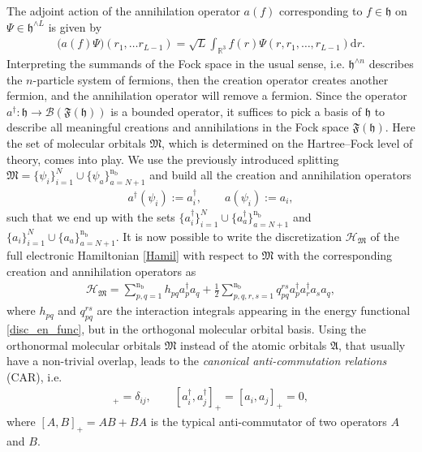 \documentclass[reqno]{amsart}
\begin{document}
 The adjoint action of the annihilation operator $a(f)$ corresponding to $f\in\mathfrak{h}$ on $\Psi\in\mathfrak{h}^{\wedge L}$ is given by \begin{align}
    \big(a(f)\Psi\big)(r_1,\ldots r_{L-1})=\sqrt{L}\int_{\mathbb{R}^3} f(r)\Psi(r,r_1,\ldots,r_{L-1})\mathrm{d}r.
\end{align} Interpreting the summands of the Fock space in the usual sense, i.e. $\mathfrak{h}^{\wedge n}$ describes the $n$-particle system of fermions, then the creation operator creates another fermion, and the annihilation operator will remove a fermion. Since the operator $a^{\dagger}:\mathfrak{h}\longrightarrow \mathcal{B}(\mathfrak{F}(\mathfrak{h}))$ is a bounded operator, it suffices to pick a basis of $\mathfrak{h}$ to describe all meaningful creations and annihilations in the Fock space $\mathfrak{F}(\mathfrak{h})$. Here the set of molecular orbitals $\mathfrak{M}$, which is determined on the Hartree–Fock level of theory, comes into play. We use the previously introduced splitting  $\mathfrak{M}=\lbrace{\psi}_i\rbrace_{i=1}^{N}\cup \lbrace \psi_a\rbrace_{a=N+1}^{\text{n}_{\text{b}}}$ and build all the creation and annihilation operators 
\begin{align}\label{calc_annihi,crea}
    a^{\dagger}(\psi_i):=a^\dagger_i,\qquad a(\psi_i):=a_i,
\end{align}
such that we end up with the sets $\lbrace a^\dagger_i\rbrace_{i=1}^{N}\cup \lbrace a^\dagger_a\rbrace_{a=N+1}^{\text{n}_{\text{b}}}$ and $\lbrace a_i\rbrace_{i=1}^{N}\cup \lbrace a_a\rbrace_{a=N+1}^{\text{n}_{\text{b}}}$. It is now possible to write the discretization $\mathcal{H}_\mathfrak{M}$ of the full electronic Hamiltonian \eqref{Hamil} with respect to $\mathfrak{M}$ with the corresponding creation and annihilation operators as 
\begin{align}\label{sec_quan_Hamil}
    \mathcal{H}_\mathfrak{M}=\sum_{p,q=1}^{\text{n}_\text{b}} h_{pq}a^\dagger_pa_q+\frac{1}{2}\sum^{\text{n}_\text{b}}_{p,q,r,s=1}q^{rs}_{pq}a^\dagger_p a^\dagger_ra_sa_q,
\end{align}
where $h_{pq}$ and $q^{rs}_{pq}$ are the interaction integrals appearing in the energy functional \eqref{disc_en_func}, but in the orthogonal molecular orbital basis. Using the orthonormal molecular orbitals $\mathfrak{M}$ instead of the atomic orbitals $\mathfrak{A}$, that usually have a non-trivial overlap, leads to the \textit{canonical anti-commutation relations} (CAR), i.e.
\begin{align}
    [a_i^\dagger,a_j]_+=\delta_{ij},\qquad [a^\dagger_i,a^\dagger_j]_+=[a_i,a_j]_+=0,
\end{align}
where $[A,B]_+=AB+BA$ is the typical anti-commutator of two operators $A$ and $B$.
\end{document}

